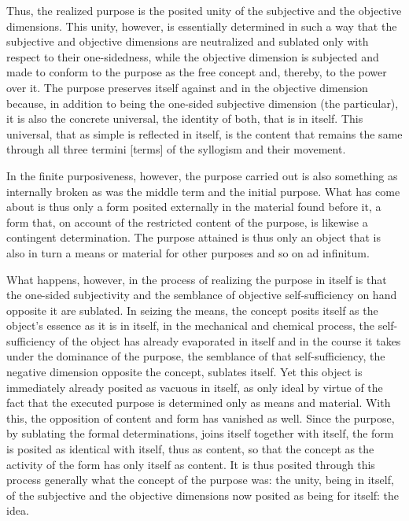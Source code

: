 Thus, the realized purpose is the posited unity of
the subjective and the objective dimensions.
This unity, however, is essentially determined in such a way that
the subjective and objective dimensions are neutralized
and sublated only with respect to their one-sidedness,
while the objective dimension is subjected and made to conform
to the purpose as the free concept and, thereby, to the power over it.
The purpose preserves itself against and in the objective dimension
because, in addition to being the one-sided subjective dimension (the particular),
it is also the concrete universal, the identity of both, that is in itself.
This universal, that as simple is reflected in itself, is the content that
remains the same through all three termini [terms] of the syllogism and their movement.

In the finite purposiveness, however,
the purpose carried out is also
something as internally broken
as was the middle term and the initial purpose.
What has come about is thus only a form
posited externally in the material found before it,
a form that, on account of the restricted content of
the purpose, is likewise a contingent determination.
The purpose attained is thus only an object
that is also in turn a means or material
for other purposes and so on ad infinitum.

What happens, however, in the process of
realizing the purpose in itself is
that the one-sided subjectivity
and the semblance of objective self-sufficiency
on hand opposite it are sublated.
In seizing the means, the concept posits itself
as the object's essence as it is in itself,
in the mechanical and chemical process,
the self-sufficiency of the object
has already evaporated in itself
and in the course it takes under
the dominance of the purpose,
the semblance of that self-sufficiency,
the negative dimension opposite the concept,
sublates itself.
Yet this object is immediately
already posited as vacuous in itself,
as only ideal by virtue of the fact
that the executed purpose is determined
only as means and material.
With this, the opposition of content and form
has vanished as well.
Since the purpose, by sublating the formal determinations,
joins itself together with itself,
the form is posited as identical with itself,
thus as content,
so that the concept as the activity of
the form has only itself as content.
It is thus posited through this process generally
what the concept of the purpose was:
the unity, being in itself,
of the subjective and the objective dimensions
now posited as being for itself:
the idea.

